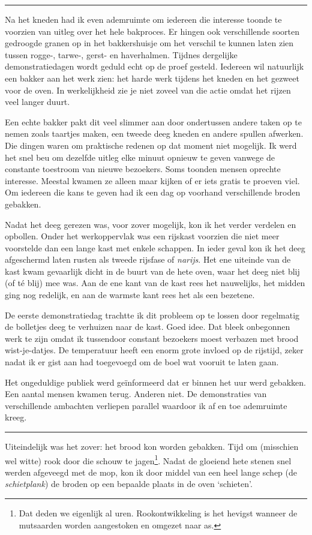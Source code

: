 \documentclass[
  11pt,
  dutch,
]{memoir}
\begin{document}
\pfbreak

Na het kneden had ik even ademruimte om iedereen die interesse toonde te
voorzien van uitleg over het hele bakproces. Er hingen ook verschillende
soorten gedroogde granen op in het bakkershuisje om het verschil te
kunnen laten zien tussen rogge-, tarwe-, gerst- en haverhalmen. Tijdnes
dergelijke demonstratiedagen wordt geduld echt op de proef gesteld.
Iedereen wil natuurlijk een bakker aan het werk zien: het harde werk
tijdens het kneden en het gezweet voor de oven. In werkelijkheid zie je
niet zoveel van die actie omdat het rijzen veel langer duurt.

Een echte bakker pakt dit veel slimmer aan door ondertussen andere taken
op te nemen zoals taartjes maken, een tweede deeg kneden en andere
spullen afwerken. Die dingen waren om praktische redenen op dat moment
niet mogelijk. Ik werd het snel beu om dezelfde uitleg elke minuut
opnieuw te geven vanwege de constante toestroom van nieuwe bezoekers.
Soms toonden mensen oprechte interesse. Meestal kwamen ze alleen maar
kijken of er iets gratis te proeven viel. Om iedereen die kans te geven
had ik een dag op voorhand verschillende broden gebakken.

Nadat het deeg gerezen was, voor zover mogelijk, kon ik het verder
verdelen en opbollen. Onder het werkoppervlak was een rijskast voorzien
die niet meer voorstelde dan een lange kast met enkele schappen. In
ieder geval kon ik het deeg afgeschermd laten rusten als tweede rijsfase
of \emph{narijs}. Het ene uiteinde van de kast kwam gevaarlijk dicht in
de buurt van de hete oven, waar het deeg niet blij (of té blij) mee was.
Aan de ene kant van de kast rees het nauwelijks, het midden ging nog
redelijk, en aan de warmste kant rees het als een bezetene.

De eerste demonstratiedag trachtte ik dit probleem op te lossen door
regelmatig de bolletjes deeg te verhuizen naar de kast. Goed idee. Dat
bleek onbegonnen werk te zijn omdat ik tussendoor constant bezoekers
moest verbazen met brood wist-je-datjes. De temperatuur heeft een enorm
grote invloed op de rijstijd, zeker nadat ik er gist aan had toegevoegd
om de boel wat vooruit te laten gaan.

Het ongeduldige publiek werd geïnformeerd dat er binnen het uur werd
gebakken. Een aantal mensen kwamen terug. Anderen niet. De demonstraties
van verschillende ambachten verliepen parallel waardoor ik af en toe
ademruimte kreeg.

\pfbreak

Uiteindelijk was het zover: het brood kon worden gebakken. Tijd om
(misschien wel witte) rook door die schouw te jagen\footnote{Dat deden
  we eigenlijk al uren. Rookontwikkeling is het hevigst wanneer de
  mutsaarden worden aangestoken en omgezet naar as.}. Nadat de gloeiend
hete stenen snel werden afgeveegd met de mop, kon ik door middel van een
heel lange schep (de \emph{schietplank}) de broden op een bepaalde
plaats in de oven `schieten'.
\end{document}
